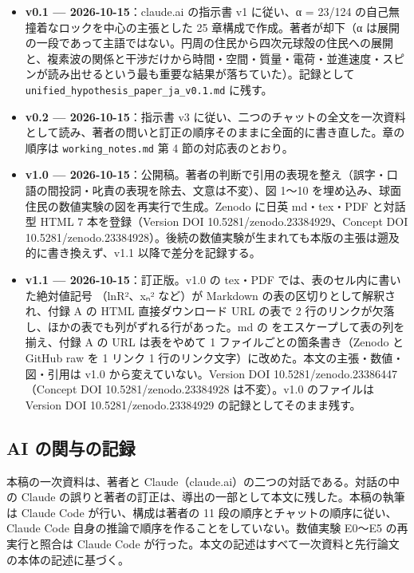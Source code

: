 \documentclass[
  a4paper,
]{ltjsarticle}
\providecommand{\tightlist}{%
  \setlength{\itemsep}{0pt}\setlength{\parskip}{0pt}}
\begin{document}
\begin{itemize}
\tightlist
\item
  \textbf{v0.1 --- 2026-10-15}：claude.ai の指示書 v1 に従い、α = 23/124
  の自己無撞着なロックを中心の主張とした 25 章構成で作成。著者が却下（α
  は展開の一段であって主語ではない。円周の住民から四次元球殻の住民への展開と、複素波の関係と干渉だけから時間・空間・質量・電荷・並進速度・スピンが読み出せるという最も重要な結果が落ちていた）。記録として
  \texttt{unified\_\allowbreak{}hypothesis\_\allowbreak{}paper\_\allowbreak{}ja\_\allowbreak{}v0.1.md} に残す。
\item
  \textbf{v0.2 --- 2026-10-15}：指示書 v3
  に従い、二つのチャットの全文を一次資料として読み、著者の問いと訂正の順序そのままに全面的に書き直した。章の順序は
  \texttt{working\_\allowbreak{}notes.md} 第 4 節の対応表のとおり。
\item
  \textbf{v1.0 ---
  2026-10-15}：公開稿。著者の判断で引用の表現を整え（誤字・口語の間投詞・叱責の表現を除去、文意は不変）、図
  1〜10 を埋め込み、球面住民の数値実験の図を再実行で生成。Zenodo に日英
  md・tex・PDF と対話型 HTML 7 本を登録（Version DOI
  10.5281/zenodo.23384929、Concept DOI
  10.5281/zenodo.23384928）。後続の数値実験が生まれても本版の主張は遡及的に書き換えず、v1.1
  以降で差分を記録する。
\item
  \textbf{v1.1 --- 2026-10-15}：訂正版。v1.0 の tex・PDF
  では、表のセル内に書いた絶対値記号
  \texttt{\textbar{}}（ln\textbar R²\textbar、\textbar xₙ\textbar²
  など）が Markdown の表の区切りとして解釈され、付録 A の HTML
  直接ダウンロード URL の表で 2
  行のリンクが欠落し、ほかの表でも列がずれる行があった。md の
  \texttt{\textbar{}} をエスケープして表の列を揃え、付録 A の URL
  は表をやめて 1 ファイルごとの箇条書き（Zenodo と GitHub raw を 1
  リンク 1 行のリンク文字）に改めた。本文の主張・数値・図・引用は v1.0
  から変えていない。Version DOI 10.5281/zenodo.23386447（Concept DOI
  10.5281/zenodo.23384928 は不変）。v1.0 のファイルは Version DOI
  10.5281/zenodo.23384929 の記録としてそのまま残す。
\end{itemize}

\subsection{AI
の関与の記録}\label{ai-ux306eux95a2ux4e0eux306eux8a18ux9332}

本稿の一次資料は、著者と
Claude（claude.ai）の二つの対話である。対話の中の Claude
の誤りと著者の訂正は、導出の一部として本文に残した。本稿の執筆は Claude
Code が行い、構成は著者の 11 段の順序とチャットの順序に従い、Claude Code
自身の推論で順序を作ることをしていない。数値実験 E0〜E5 の再実行と照合は
Claude Code
が行った。本文の記述はすべて一次資料と先行論文の本体の記述に基づく。
\end{document}

